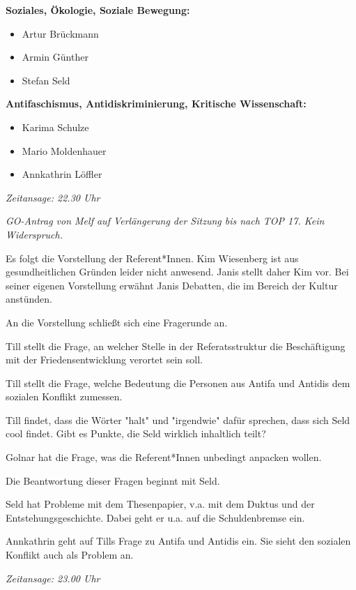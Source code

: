 \documentclass[ngerman,headheight=70pt]{scrartcl}
\begin{document}
    \textbf{Soziales, Ökologie, Soziale Bewegung:}
    \begin{itemize}
        \item Artur Brückmann
        \item Armin Günther
        \item Stefan Seld
    \end{itemize}

    \textbf{Antifaschismus, Antidiskriminierung, Kritische Wissenschaft:}
    \begin{itemize}
        \item Karima Schulze
        \item Mario Moldenhauer
        \item Annkathrin Löffler
    \end{itemize}

    \textit{Zeitansage: 22.30 Uhr}

    \textit{GO-Antrag von Melf auf Verlängerung der Sitzung bis nach TOP 17.
    Kein Widerspruch.}

    Es folgt die Vorstellung der Referent*Innen. Kim Wiesenberg ist aus
    gesundheitlichen Gründen leider nicht anwesend. Janis stellt daher Kim vor.
    Bei seiner eigenen Vorstellung erwähnt Janis Debatten, die im Bereich der
    Kultur anstünden.

    An die Vorstellung schließt sich eine Fragerunde an.

    Till stellt die Frage, an welcher Stelle in der Referatsstruktur die
    Beschäftigung mit der Friedensentwicklung verortet sein soll.

    Till stellt die Frage, welche Bedeutung die Personen aus Antifa und Antidis
    dem sozialen Konflikt zumessen.

    Till findet, dass die Wörter "halt" und "irgendwie" dafür sprechen, dass sich
    Seld cool findet. Gibt es Punkte, die Seld wirklich inhaltlich teilt?

    Golnar hat die Frage, was die Referent*Innen unbedingt anpacken wollen.

    Die Beantwortung dieser Fragen beginnt mit Seld.

    Seld hat Probleme mit dem Thesenpapier, v.a. mit dem Duktus und der
    Entstehungsgeschichte. Dabei geht er u.a. auf die Schuldenbremse ein.

    Annkathrin geht auf Tills Frage zu Antifa und Antidis ein. Sie sieht
    den sozialen Konflikt auch als Problem an.

    \textit{Zeitansage: 23.00 Uhr}
\end{document}
